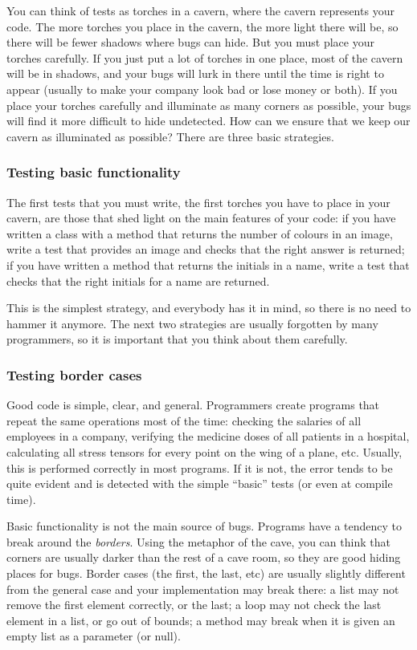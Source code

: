 You can think of tests as torches in a cavern, where the cavern
represents your code. The more
torches you place in the cavern, the more light there will be, so there
will be fewer shadows where bugs can hide. But you must place your
torches carefully. If you just put a lot of torches in one place, most
of the cavern will be in shadows, and your bugs will lurk in there until
the time is right to appear (usually to make your company look bad or
lose money or both). If you place your torches carefully and
illuminate as many corners as possible, your bugs will find it more
difficult to hide undetected. How can we ensure that we keep our
cavern as illuminated as possible? There are three basic strategies.

\subsubsection{Testing basic functionality}
\label{sec:test-basic-funct}

The first tests that you must write, the first torches you have to
place in your cavern, are those that shed light on the main features
of your code: if you have written a class with a method that returns
the number of colours in an image, write a test that provides an image
and checks that the right answer is returned; if you have written a
method that returns the initials in a name, write a test that checks
that the right initials for a name are returned. 

This is the simplest strategy, and everybody has it in mind, so there
is no need to hammer it anymore. The next two strategies are usually
forgotten by many programmers, so it is important that you think about
them carefully. 

\subsubsection{Testing border cases}
\label{sec:testing-border-cases}

Good code is simple, clear, and general. Programmers create programs
that repeat the same operations most of the time: checking the
salaries of all employees in a company, verifying the medicine doses
of all patients in a hospital, calculating all stress tensors for
every point on the wing of a plane, etc. Usually, this is performed
correctly in most programs. If it is not, the error tends to be quite
evident and is detected with the simple
``basic'' tests (or even at compile time).

Basic functionality is not the main source of bugs. 
Programs have a tendency to break around the \emph{borders}. Using the
metaphor of the cave, you can think that corners are usually darker
than the rest of a cave room, so they are good hiding places for
bugs. Border cases (the first, the last, etc) are usually slightly
different from the general case and your implementation may break
there: a list may not remove the first element correctly, or the
last; a loop may not check the last element in a list, or go out of
bounds; a method may break when it is given an empty list as a
parameter (or null). 

